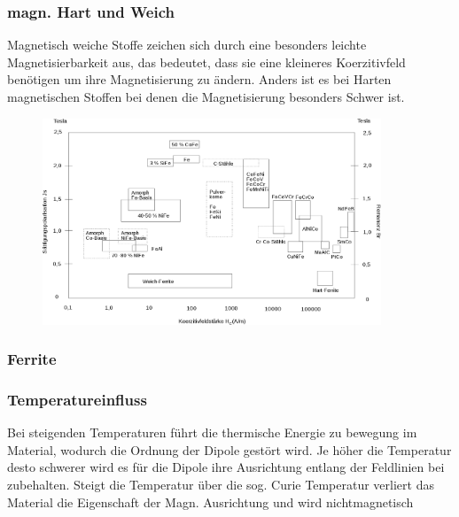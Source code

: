         \subsubsection*{magn. Hart und Weich}
            Magnetisch weiche Stoffe zeichen sich durch eine besonders leichte Magnetisierbarkeit aus, das bedeutet,
            dass sie eine kleineres Koerzitivfeld benötigen um ihre Magnetisierung zu ändern. Anders ist es bei Harten
            magnetischen Stoffen bei denen die Magnetisierung besonders Schwer ist.
            \begin{figure}[H]
                \centering
                \includegraphics[width=0.9\textwidth]{Images/Übersicht_Koerzitivfeldstärke.png}
            \end{figure}
        \subsubsection*{Ferrite}
            
        \subsubsection*{Temperatureinfluss}
            Bei steigenden Temperaturen führt die thermische Energie zu bewegung im Material, wodurch die Ordnung der
            Dipole gestört wird. Je höher die Temperatur desto schwerer wird es für die Dipole ihre Ausrichtung entlang 
            der Feldlinien bei zubehalten. Steigt die Temperatur über die sog. Curie Temperatur verliert das Material
            die Eigenschaft der Magn. Ausrichtung und wird nichtmagnetisch 
